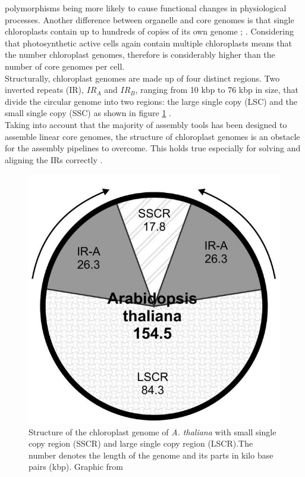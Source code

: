 polymorphisms being more likely to cause functional changes in physiological
processes. Another difference between organelle and core genomes is that single
chloroplasts contain up to hundreds of copies of its own genome \cite{kumar_2014};
\cite{bendich_1987}. Considering that photosynthetic active cells again contain multiple
chloroplasts means that the number chloroplast genomes, therefore is considerably higher than the number of core genomes per cell. \\
Structurally, chloroplast genomes are made up of four distinct regions. Two inverted
repeats (IR), $IR_A$ and $IR_B$, ranging from 10 kbp to 76 kbp in size, that divide the
circular genome into two regions: the large
single copy (LSC) and the small single copy (SSC) as shown in figure \ref{fig:cpast_genome} \cite{palmer_1985}.\\
Taking into account that the majority of assembly tools has been designed to assemble
linear core genomes, the structure of chloroplast genomes is an obstacle for the assembly
pipelines to overcome. This holds true especially for solving and aligning the IRs correctly
\cite{Wang2018}.

\begin{figure}[H]
\centering
\includegraphics[height=.55\textheight, width=.95\textwidth]{Figures/cpast}
\decoRule
\caption[Structure of a chloroplast genome]{Structure of the chloroplast genome of
  \textit{A. thaliana} with small single copy region (SSCR) and large single copy region
  (LSCR).The number denotes the length of the genome and its parts in kilo base pairs
  (kbp). Graphic from \cite{olejniczak2016chloroplasts}}
\label{fig:cpast_genome}
\end{figure}

